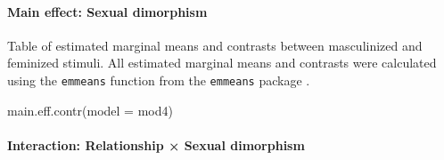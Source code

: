 \documentclass[
  bookmarksnumbered]{article}
\newenvironment{Shaded}{\begin{snugshade}}{\end{snugshade}}
\newcommand{\AttributeTok}[1]{\textcolor[rgb]{0.80,0.80,0.80}{#1}}
\newcommand{\FunctionTok}[1]{\textcolor[rgb]{0.94,0.94,0.56}{#1}}
\newcommand{\NormalTok}[1]{\textcolor[rgb]{0.80,0.80,0.80}{#1}}
\begin{document}
\paragraph{Main effect: Sexual dimorphism}\label{main-effect-sexual-dimorphism-3}

Table of estimated marginal means and contrasts between masculinized and feminized stimuli. All estimated marginal means and contrasts were calculated using the \texttt{emmeans} function from the \texttt{emmeans} package \autocite{emmeanscit}.

\begin{Shaded}
\begin{Highlighting}[]
\FunctionTok{main.eff.contr}\NormalTok{(}\AttributeTok{model =}\NormalTok{ mod4)}
\end{Highlighting}
\end{Shaded}

\begin{table}[H]
\centering
\caption{\label{tab:unnamed-chunk-43}Estimated marginal and constrast between masculinized and feminized 
                           stimuli for the PCF model}
\centering
{}
\end{table}

\paragraph{Interaction: Relationship × Sexual dimorphism}\label{interaction-relationship-sexual-dimorphism-2}
\end{document}
